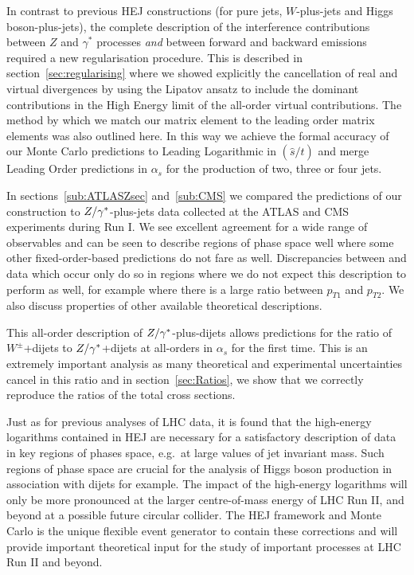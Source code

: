 	In contrast to previous HEJ constructions (for pure jets, $W$-plus-jets and
	Higgs boson-plus-jets), the complete description of the interference
	contributions between $Z$ and $\gamma^*$ processes \emph{and} between forward
	and backward emissions required a new regularisation procedure.  This is
	described in section~\ref{sec:regularising} where we showed explicitly the
	cancellation of real and virtual divergences by using the Lipatov ansatz to
	include the dominant contributions in the High Energy limit of the all-order
	virtual contributions.  The method by which we match our matrix element to the
	leading order matrix elements was also outlined here. In this way we
	achieve the formal accuracy of our Monte Carlo predictions to Leading
	Logarithmic in $(\hat{s}/\hat{t})$ and merge Leading Order predictions in $\alpha_s$ for the
	production of two, three or four jets.

	In sections~\ref{sub:ATLASZsec} and~\ref{sub:CMS} we compared the predictions of our
	construction to $Z/\gamma^*$-plus-jets data collected at the ATLAS and CMS experiments
	during Run I.  We see excellent agreement for a wide range of observables and
	can be seen to describe regions of phase space well where some other
	fixed-order-based predictions do not fare as well.  Discrepancies between \HEJ and data which occur
	only do so in regions where we do not expect this description to perform as
	well, for example where there is a large ratio between $p_{T1}$ and $p_{T2}$.
	We also discuss properties of other available theoretical descriptions.

	This all-order description of $Z/\gamma^*$-plus-dijets allows predictions for the ratio
	of $W^\pm$+dijets to $Z/\gamma^*$+dijets at all-orders in $\alpha_s$ for the first
	time.  This is an extremely important analysis as many theoretical and
	experimental uncertainties cancel in this ratio and in section~\ref{sec:Ratios},
	we show that we correctly reproduce the ratios of the total cross sections.

	Just as for previous analyses of LHC data, it is found that the high-energy logarithms
	contained in HEJ are necessary for a satisfactory description of data in key regions of phases
	space, e.g.~at large values of jet invariant mass. Such regions of phase
	space are crucial for the analysis of Higgs boson production in association
	with dijets for example. The impact of the high-energy
	logarithms will only be more pronounced at the larger centre-of-mass energy of
	LHC Run II, and beyond at a possible future circular collider.  The HEJ
	framework and Monte
	Carlo is the unique flexible event generator to contain these corrections and
	will provide important theoretical input for the study of important processes
	at LHC Run II and beyond.

